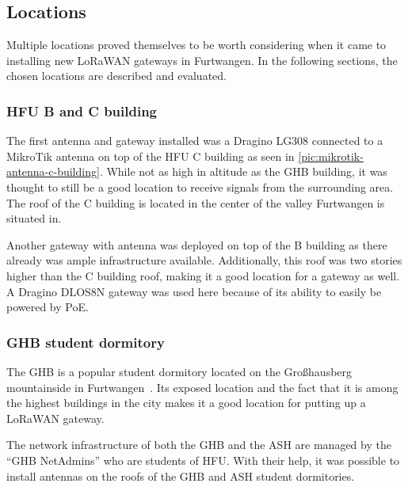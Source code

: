\subsection{Locations}


Multiple locations proved themselves to be worth considering when it came to installing new \ac{LoRaWAN} gateways in Furtwangen.
In the following sections, the chosen locations are described and evaluated.

\subsubsection{\ac{HFU} B and C building}

The first antenna and gateway installed was a Dragino LG308 connected to a MikroTik antenna on top of the \ac{HFU} C building as seen in \cref{pic:mikrotik-antenna-c-building}.
While not as high in altitude as the \ac{GHB} building, it was thought to still be a good location to receive signals from the surrounding area.
The roof of the C building is located in the center of the valley Furtwangen is situated in.

Another gateway with antenna was deployed on top of the B building as there already was ample infrastructure available.
Additionally, this roof was two stories higher than the C building roof, making it a good location for a gateway as well.
A Dragino DLOS8N gateway was used here because of its ability to easily be powered by \ac{PoE}.

\subsubsection{\acf{GHB} student dormitory}

The \ac{GHB} is a popular student dormitory located on the Großhausberg mountainside in Furtwangen~\cite{ghb_netadmins_student_2023}.
Its exposed location and the fact that it is among the highest buildings in the city makes it a good location for putting up a \ac{LoRaWAN} gateway.

The network infrastructure of both the \ac{GHB} and the \ac{ASH} are managed by the ``\ac{GHB} NetAdmins'' who are students of \ac{HFU}.
With their help, it was possible to install antennas on the roofs of the \ac{GHB} and \ac{ASH} student dormitories.

